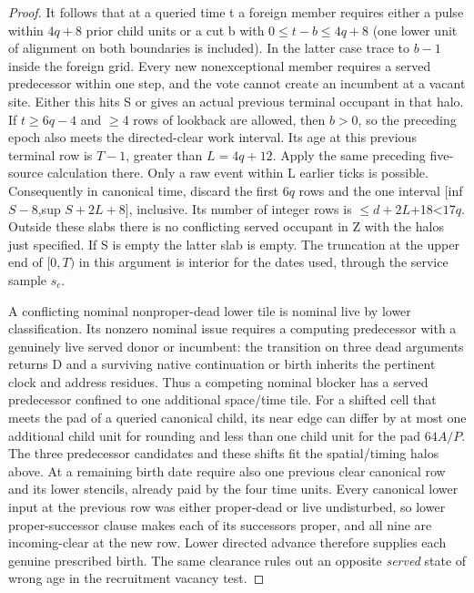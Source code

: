 \begin{proof}
It follows that at a queried time t a foreign member requires either a pulse within \(4q+8\) prior child units or a cut b with \(0\le t- b\le 4q+8\) (one lower unit of alignment on both boundaries is included). In the latter case trace to \(b- 1\) inside the foreign grid. Every new nonexceptional member requires a served predecessor within one step, and the vote cannot create an incumbent at a vacant site. Either this hits S or gives an actual previous terminal occupant in that halo. If \(t\ge 6q- 4\) and \(\ge\)4 rows of lookback are allowed, then \(b>0\), so the preceding epoch also meets the directed-clear work interval. Its age at this previous terminal row is \(T- 1\), greater than \(L=4q+12\). Apply the same preceding five-source calculation there. Only a raw event within L earlier ticks is possible. Consequently in canonical time, discard the first \(6q\) rows and the one interval [inf \(S- 8\),sup \(S+2L+8]\), inclusive. Its number of integer rows is \(\le\)\(d+2L\)+18\textless{}\(17q\). Outside these slabs there is no conflicting served occupant in Z with the halos just specified. If S is empty the latter slab is empty. The truncation at the upper end of \([0,T)\) in this argument is interior for the dates used, through the service sample \(s_c\).

A conflicting nominal nonproper-dead lower tile is nominal live by lower classification. Its nonzero nominal issue requires a computing predecessor with a genuinely live served donor or incumbent: the transition on three dead arguments returns D and a surviving native continuation or birth inherits the pertinent clock and address residues. Thus a competing nominal blocker has a served predecessor confined to one additional space/time tile. For a shifted cell that meets the pad of a queried canonical child, its near edge can differ by at most one additional child unit for rounding and less than one child unit for the pad \(64A/P\). The three predecessor candidates and these shifts fit the spatial/timing halos above. At a remaining birth date require also one previous clear canonical row and its lower stencils, already paid by the four time units. Every canonical lower input at the previous row was either proper-dead or live undisturbed, so lower proper-successor clause makes each of its successors proper, and all nine are incoming-clear at the new row. Lower directed advance therefore supplies each genuine prescribed birth. The same clearance rules out an opposite \emph{served} state of wrong age in the recruitment vacancy test.


\end{proof}
